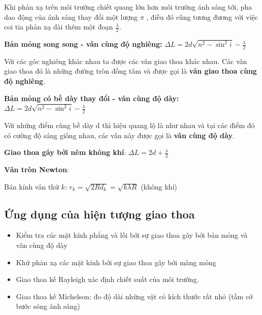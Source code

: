 \documentclass[12pt,a4paper]{article}
\begin{document}
Khi phản xạ trên môi trường chiết quang
lớn hơn môi trường ánh sáng tới, pha dao động của ánh
sáng thay đổi một lượng $\pi$ , điều đó cũng tương
đương với việc coi tia phản xạ dài thêm một đoạn $\frac{\lambda}{2}$.

\textbf{Bản mỏng song song - vân cùng độ nghiêng:} $\Delta L = 2d\sqrt{n^2 - \sin^2 i} - \frac{\lambda}{2}$

Với các góc nghiêng khác nhau ta được các
vân giao thoa khác nhau. Các vân giao thoa đó là
những đường tròn đồng tâm và được gọi là {\textbf{vân giao thoa cùng độ nghiêng}}.

\textbf{Bản mỏng có bề dày thay đổi - vân cùng độ dày:} $\Delta L = 2d\sqrt{n^2 - \sin^2 i}  - \frac{\lambda}{2}$

Với những điểm cùng bề dày d thì hiệu quang lộ là
như nhau và tại các điểm đó có cường độ sáng giống
nhau, các vân này được gọi là \textbf{vân cùng độ dày}.

\textbf{Giao thoa gây bởi nêm không khí}: $\Delta L = 2d + \frac{\lambda}{2}$

\textbf{Vân tròn Newton}:

Bán kính vân thứ $k$: $r_k = \sqrt{2R d_k} = \sqrt{k \lambda R}$ (không khí)

\subsection*{Ứng dụng của hiện tượng giao thoa}

\begin{itemize}
    \item Kiểm tra các mặt kính phẳng và lồi bởi sự giao thoa gây bởi bản mỏng và vân cùng độ dày
    \item Khử phản xạ các mặt kính bởi sự giao thoa gây bởi màng mỏng
    \item Giao thoa kế Rayleigh xác định chiết suất của môi trường.
    \item Giao thoa kế Michelson: đo độ dài những vật có kích thước rất nhỏ (tầm cở bước sóng
ánh sáng)
\end{itemize}
\end{document}
